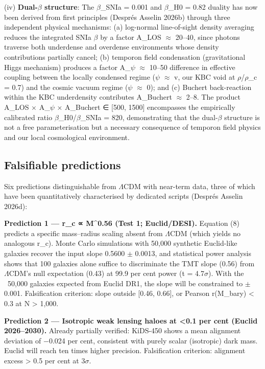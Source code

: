 \documentclass[a4paper,fleqn,usenatbib]{mnras}
\begin{document}
(iv) \textbf{Dual-$\beta$ structure}: The $\beta$_SNIa = 0.001 and $\beta$_H0 = 0.82 duality has now been derived from first principles (Després Asselin 2026b) through three independent physical mechanisms: (a) log-normal line-of-sight density averaging reduces the integrated SNIa $\beta$ by a factor A_LOS $\approx$ 20–40, since photons traverse both underdense and overdense environments whose density contributions partially cancel; (b) temporon field condensation (gravitational Higgs mechanism) produces a factor A_$\psi$ $\approx$ 10–50 difference in effective coupling between the locally condensed regime ($\psi$ $\approx$ v, our KBC void at $\rho$/$\rho$_c = 0.7) and the cosmic vacuum regime ($\psi$ $\approx$ 0); and (c) Buchert back-reaction within the KBC underdensity contributes A_Buchert $\approx$ 2–8. The product A_LOS $\times$ A_$\psi$ $\times$ A_Buchert ∈ [500, 1500] encompasses the empirically calibrated ratio $\beta$_H0/$\beta$_SNIa = 820, demonstrating that the dual-$\beta$ structure is not a free parameterisation but a necessary consequence of temporon field physics and our local cosmological environment.


\subsection{Falsifiable predictions}\label{sec:5-4-falsifiable-predictions}

Six predictions distinguishable from $\Lambda$CDM with near-term data, three of which have been quantitatively characterised by dedicated scripts (Després Asselin 2026d):

\textbf{Prediction 1 — r_c ∝ M^0.56 (Test 1; Euclid/DESI).}
Equation (8) predicts a specific mass–radius scaling absent from $\Lambda$CDM (which yields no analogous r_c). Monte Carlo simulations with 50,000 synthetic Euclid-like galaxies recover the input slope 0.5600 $\pm$ 0.0013, and statistical power analysis shows that 100 galaxies alone suffice to discriminate the TMT slope (0.56) from $\Lambda$CDM's null expectation (0.43) at 99.9 per cent power (t = 4.7$\sigma$). With the ~50,000 galaxies expected from Euclid DR1, the slope will be constrained to $\pm$0.001. Falsification criterion: slope outside [0.46, 0.66], or Pearson r(M_bary) < 0.3 at N > 1,000.

\textbf{Prediction 2 — Isotropic weak lensing haloes at <0.1 per cent (Euclid 2026–2030).}
Already partially verified: KiDS-450 shows a mean alignment deviation of −0.024 per cent, consistent with purely scalar (isotropic) dark mass. Euclid will reach ten times higher precision. Falsification criterion: alignment excess > 0.5 per cent at 3$\sigma$.
\end{document}
